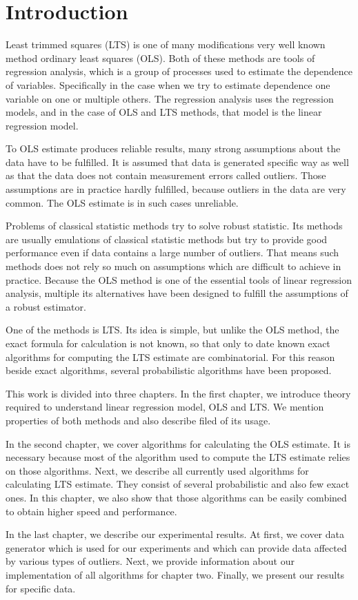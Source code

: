 \chapter{Introduction}
Least trimmed squares (LTS) is one of many modifications very well known method ordinary least squares (OLS). Both of these methods are tools of regression analysis, which is a group of processes used to estimate the dependence of variables. Specifically in the case when we try to estimate dependence one variable on one or multiple others. The regression analysis uses the regression models, and in the case of OLS and LTS methods, that model is the linear regression model.

To OLS estimate produces reliable results, many strong assumptions about the data have to be fulfilled. It is assumed that data is generated specific way as well as that the data does not contain measurement errors called outliers. Those assumptions are in practice hardly fulfilled, because outliers in the data are very common. The OLS estimate is in such cases unreliable.

Problems of classical statistic methods try to solve robust statistic. Its methods are usually emulations of classical statistic methods but try to provide good performance even if data contains a large number of outliers. That means such methods does not rely so much on assumptions which are difficult to achieve in practice. Because the OLS method is one of the essential tools of linear regression analysis, multiple its alternatives have been designed to fulfill the assumptions of a robust estimator.

One of the methods is LTS. Its idea is simple, but unlike the OLS method, the exact formula for calculation is not known, so that only to date known exact algorithms for computing the LTS estimate are combinatorial. For this reason beside exact algorithms, several probabilistic algorithms have been proposed.

This work is divided into three chapters. In the first chapter, we introduce theory required to understand linear regression model, OLS and LTS. We mention properties of both methods and also describe filed of its usage.

In the second chapter, we cover algorithms for calculating the OLS estimate. It is necessary because most of the algorithm used to compute the LTS estimate relies on those algorithms. Next, we describe all currently used algorithms for calculating LTS estimate. They consist of several probabilistic and also few exact ones. In this chapter, we also show that those algorithms can be easily combined to obtain higher speed and performance.

In the last chapter, we describe our experimental results. At first, we cover data generator which is used for our experiments and which can provide data affected by various types of outliers. Next, we provide information about our implementation of all algorithms for chapter two. Finally, we present our results for specific data.